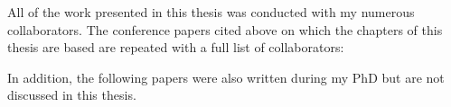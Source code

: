 \medskip

All of the work presented in this thesis was conducted with my numerous collaborators. 
The conference papers cited above on which the chapters of this thesis are based are repeated with a full list of collaborators:

\medskip


\begin{quote}

\medskip


\medskip

\end{quote}

\medskip

In addition, the following papers were also written during my PhD but are not discussed in this thesis.

\begin{quote}








\end{quote}























